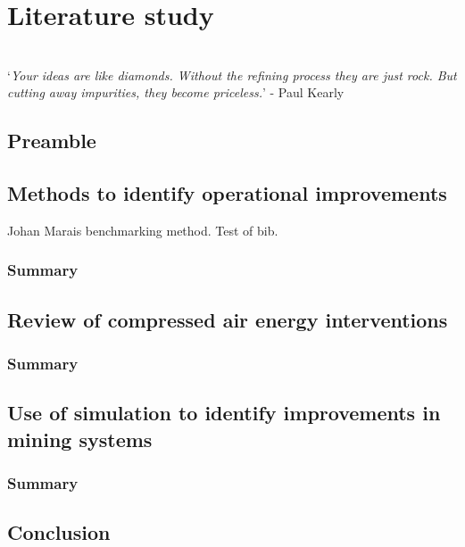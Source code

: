 \chapter{Literature study}
\vspace{38em}

\hrulefill
\\
\enquote*{\textit{Your ideas are like diamonds. Without the refining process they are just rock. But cutting away impurities, they become priceless.}} - Paul Kearly\\
\newpage
\section{Preamble}
\section{Methods to identify operational improvements}
Johan Marais benchmarking method. Test of bib. 

	\subsection{Summary}
\section{Review of compressed air energy interventions}
	\subsection{Summary}
\section{Use of simulation to identify improvements in mining systems}

	\subsection{Summary}
\section{Conclusion}